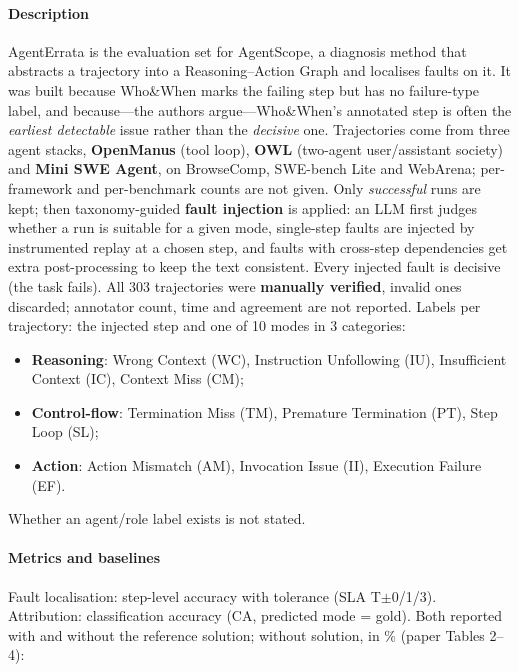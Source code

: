 \paragraph{Description} AgentErrata is the evaluation set for AgentScope, a diagnosis method that abstracts a trajectory into a Reasoning--Action Graph and localises faults on it. It was built because Who\&When marks the failing step but has no failure-type label, and because---the authors argue---Who\&When's annotated step is often the \emph{earliest detectable} issue rather than the \emph{decisive} one. Trajectories come from three agent stacks, \textbf{OpenManus} (tool loop), \textbf{OWL} (two-agent user/assistant society) and \textbf{Mini SWE Agent}, on BrowseComp, SWE-bench Lite and WebArena; per-framework and per-benchmark counts are not given. Only \emph{successful} runs are kept; then taxonomy-guided \textbf{fault injection} is applied: an LLM first judges whether a run is suitable for a given mode, single-step faults are injected by instrumented replay at a chosen step, and faults with cross-step dependencies get extra post-processing to keep the text consistent. Every injected fault is decisive (the task fails). All 303 trajectories were \textbf{manually verified}, invalid ones discarded; annotator count, time and agreement are not reported. Labels per trajectory: the injected step and one of 10 modes in 3 categories:
\begin{itemize}
\item \textbf{Reasoning}: Wrong Context (WC), Instruction Unfollowing (IU), Insufficient Context (IC), Context Miss (CM);
\item \textbf{Control-flow}: Termination Miss (TM), Premature Termination (PT), Step Loop (SL);
\item \textbf{Action}: Action Mismatch (AM), Invocation Issue (II), Execution Failure (EF).
\end{itemize}
Whether an agent/role label exists is not stated.

\paragraph{Metrics and baselines} Fault localisation: step-level accuracy with tolerance (SLA T$\pm$0/1/3). Attribution: classification accuracy (CA, predicted mode = gold). Both reported with and without the reference solution; without solution, in \% (paper Tables 2--4):

